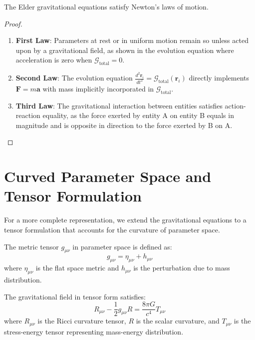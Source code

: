 \begin{theorem}
The Elder gravitational equations satisfy Newton's laws of motion.
\end{theorem}

\begin{proof}
\begin{enumerate}
    \item \textbf{First Law}: Parameters at rest or in uniform motion remain so unless acted upon by a gravitational field, as shown in the evolution equation where acceleration is zero when $\mathcal{G}_{\text{total}} = 0$.
    
    \item \textbf{Second Law}: The evolution equation $\frac{d^2\mathbf{r}_i}{dt^2} = \mathcal{G}_{\text{total}}(\mathbf{r}_i)$ directly implements $\mathbf{F} = m\mathbf{a}$ with mass implicitly incorporated in $\mathcal{G}_{\text{total}}$.
    
    \item \textbf{Third Law}: The gravitational interaction between entities satisfies action-reaction equality, as the force exerted by entity A on entity B equals in magnitude and is opposite in direction to the force exerted by B on A.
\end{enumerate}
\end{proof}

\section{Curved Parameter Space and Tensor Formulation}

For a more complete representation, we extend the gravitational equations to a tensor formulation that accounts for the curvature of parameter space.

\begin{definition}
The metric tensor $g_{\mu\nu}$ in parameter space is defined as:
\begin{equation}
g_{\mu\nu} = \eta_{\mu\nu} + h_{\mu\nu}
\end{equation}
where $\eta_{\mu\nu}$ is the flat space metric and $h_{\mu\nu}$ is the perturbation due to mass distribution.
\end{definition}

\begin{theorem}
The gravitational field in tensor form satisfies:
\begin{equation}
R_{\mu\nu} - \frac{1}{2}g_{\mu\nu}R = \frac{8\pi G}{c^4}T_{\mu\nu}
\end{equation}
where $R_{\mu\nu}$ is the Ricci curvature tensor, $R$ is the scalar curvature, and $T_{\mu\nu}$ is the stress-energy tensor representing mass-energy distribution.
\end{theorem}

